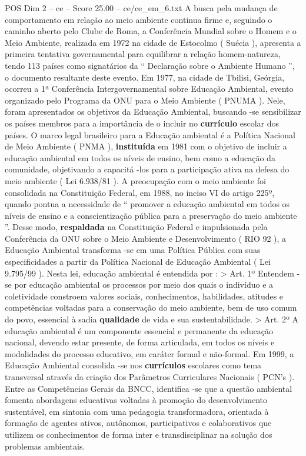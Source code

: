 \begin{textsample}{POS Dim 2 – ce – Score 25.00 – ce/ce\_em\_6.txt}
A busca pela mudança de comportamento em relação ao meio ambiente continua firme e, seguindo o caminho aberto pelo Clube de Roma, a Conferência Mundial sobre o Homem e o Meio Ambiente, realizada em 1972 na cidade de Estocolmo ( Suécia ), apresenta a primeira tentativa governamental para equilibrar a relação homem-natureza, tendo 113 países como signatários da “ Declaração sobre o Ambiente Humano ”, o documento resultante deste evento.
Em 1977, na cidade de Tbilisi, Geórgia, ocorreu a 1ª Conferência Intergovernamental sobre Educação Ambiental, evento organizado pelo Programa da ONU para o Meio Ambiente ( PNUMA ).
Nele, foram apresentados os objetivos da Educação Ambiental, buscando -se sensibilizar os países membros para a importância de o incluir no \textbf{currículo} escolar dos países.
O marco legal brasileiro para a Educação ambiental é a Política Nacional de Meio Ambiente ( PNMA ), \textbf{instituída} em 1981 com o objetivo de incluir a educação ambiental em todos os níveis de ensino, bem como a educação da comunidade, objetivando a capacitá -los para a participação ativa na defesa do meio ambiente ( Lei 6.938/81 ).
A preocupação com o meio ambiente foi consolidada na Constituição Federal, em 1988, no inciso VI do artigo 225º, quando pontua a necessidade de “ promover a educação ambiental em todos os níveis de ensino e a conscientização pública para a preservação do meio ambiente ”.
Desse modo, \textbf{respaldada} na Constituição Federal e impulsionada pela Conferência da ONU sobre o Meio Ambiente e Desenvolvimento ( RIO 92 ), a Educação Ambiental transforma -se em uma Política Pública com suas especificidades a partir da Política Nacional de Educação Ambiental ( Lei 9.795/99 ).
Nesta lei, educação ambiental é entendida por : > Art. 1º Entendem -se por educação ambiental os processos por meio dos quais o indivíduo e a coletividade constroem valores sociais, conhecimentos, habilidades, atitudes e competências voltadas para a conservação do meio ambiente, bem de uso comum do povo, essencial à sadia \textbf{qualidade} de vida e sua sustentabilidade. > Art. 2º A educação ambiental é um componente essencial e permanente da educação nacional, devendo estar presente, de forma articulada, em todos os níveis e modalidades do processo educativo, em caráter formal e não-formal.
Em 1999, a Educação Ambiental consolida -se nos \textbf{currículos} escolares como tema transversal através da criação dos Parâmetros Curriculares Nacionais ( PCN’s ).
Entre as Competências Gerais da BNCC, identifica -se que a questão ambiental fomenta abordagens educativas voltadas à promoção do desenvolvimento sustentável, em sintonia com uma pedagogia transformadora, orientada à formação de agentes ativos, autônomos, participativos e colaborativos que utilizem os conhecimentos de forma inter e transdisciplinar na solução dos problemas ambientais.

\end{textsample}
